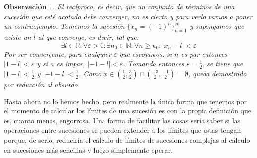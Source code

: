 \documentclass[10pt,a4paper,openright]{book}
\theoremstyle{break}
\newtheorem{obs}{\underline{Observación}}[chapter]
\begin{document}
\begin{obs}
El recíproco, es decir, que un conjunto de términos de una sucesión que esté acotado debe converger, no es cierto y para verlo vamos a poner un contraejemplo. Tomemos la sucesión $\{x_n=(-1)^n\}_{n=1}^\infty$ y supongamos que existe un $l$ al que converge, es decir, tal que:
\[
\exists l \in \mathbb R: \forall \varepsilon>0: \exists n_0\in \mathbb N: \forall n\geq n_0: |x_n-l|<\varepsilon
\]
Por ser convergente, para cualquier $\varepsilon$ que escojamos, si $n$ es par entonces $|1-l|<\varepsilon$ y si $n$ es impar, $|-1-l|<\varepsilon$. Tomando entonces $\varepsilon=\frac{1}{2}$, se tiene que $|1-l|<\frac{1}{2}$ y $|-1-l|<\frac{1}{2}$. Como $x\in (\frac{1}{2}, \frac{3}{2})\cap (\frac{-3}{2}, \frac{-1}{2})=\emptyset$, queda demostrado por reducción al absurdo.
\end{obs}

Hasta ahora no lo hemos hecho, pero realmente la única forma que tenemos por el momento de calcular los límites de una sucesión es con la propia definición que es, cuanto menos, engorrosa. Una forma de facilitar las cosas sería saber si las operaciones entre sucesiones se pueden extender a los límites que estas tengan porque, de serlo, reduciría el cálculo de límites de sucesiones complejas al cálculo en sucesiones más sencillas y luego simplemente operar.
\end{document}
